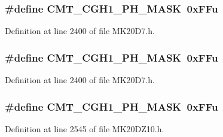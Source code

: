 \subsubsection[{\texorpdfstring{C\+M\+T\+\_\+\+C\+G\+H1\+\_\+\+P\+H\+\_\+\+M\+A\+SK}{CMT_CGH1_PH_MASK}}]{\setlength{\rightskip}{0pt plus 5cm}\#define C\+M\+T\+\_\+\+C\+G\+H1\+\_\+\+P\+H\+\_\+\+M\+A\+SK~0x\+F\+Fu}\hypertarget{group___c_m_t___register___masks_ga4ca405c6721e302fabcb4ddcc7773f1a}{}\label{group___c_m_t___register___masks_ga4ca405c6721e302fabcb4ddcc7773f1a}


Definition at line 2400 of file M\+K20\+D7.\+h.

\subsubsection[{\texorpdfstring{C\+M\+T\+\_\+\+C\+G\+H1\+\_\+\+P\+H\+\_\+\+M\+A\+SK}{CMT_CGH1_PH_MASK}}]{\setlength{\rightskip}{0pt plus 5cm}\#define C\+M\+T\+\_\+\+C\+G\+H1\+\_\+\+P\+H\+\_\+\+M\+A\+SK~0x\+F\+Fu}\hypertarget{group___c_m_t___register___masks_ga4ca405c6721e302fabcb4ddcc7773f1a}{}\label{group___c_m_t___register___masks_ga4ca405c6721e302fabcb4ddcc7773f1a}


Definition at line 2400 of file M\+K20\+D7.\+h.

\subsubsection[{\texorpdfstring{C\+M\+T\+\_\+\+C\+G\+H1\+\_\+\+P\+H\+\_\+\+M\+A\+SK}{CMT_CGH1_PH_MASK}}]{\setlength{\rightskip}{0pt plus 5cm}\#define C\+M\+T\+\_\+\+C\+G\+H1\+\_\+\+P\+H\+\_\+\+M\+A\+SK~0x\+F\+Fu}\hypertarget{group___c_m_t___register___masks_ga4ca405c6721e302fabcb4ddcc7773f1a}{}\label{group___c_m_t___register___masks_ga4ca405c6721e302fabcb4ddcc7773f1a}


Definition at line 2545 of file M\+K20\+D\+Z10.\+h.


